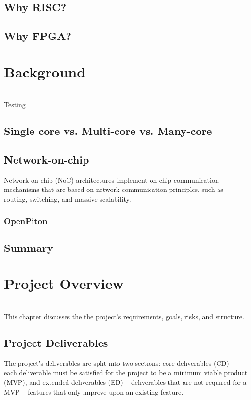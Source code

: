 \documentclass[11pt,a4paper]{report}
\begin{document}
{\section{Why RISC?}
\section{Why FPGA?}
    
\chapter{Background}
{%
\startcontents[chapters]
}
\noindent\\
Testing

\section{Single core vs. Multi-core vs. Many-core}
\section{Network-on-chip}
Network-on-chip (NoC) architectures implement on-chip communication mechanisms that are based on network communication  principles, such as routing, switching, and massive scalability.

\subsection{OpenPiton}
\section{Summary}
    
\chapter{Project Overview}
{%
\startcontents[chapters]
}
\noindent\\
This chapter discusses the the project's requirements, goals, risks, and structure.

\section{Project Deliverables}
The project's deliverables are split into two sections: core deliverables (CD) -- each deliverable must be satisfied for the project to be a minimum viable product (MVP), and extended deliverables (ED) -- deliverables that are not required for a MVP -- features that only improve upon an existing feature.

}
\end{document}
